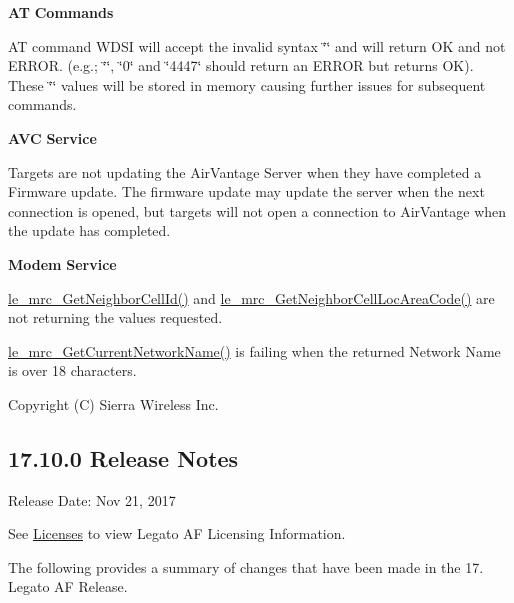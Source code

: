 {\bfseries AT} {\bfseries Commands} 
\begin{DoxyItemize}
\item AT command {\ttfamily W\+D\+SI} will accept the invalid syntax \char`\"{}\char`\"{} and will return {\ttfamily OK} and not {\ttfamily E\+R\+R\+OR}. (e.\+g.; \char`\"{}\char`\"{}, \char`\"{}0\char`\"{} and \char`\"{}4447\char`\"{} should return an {\ttfamily E\+R\+R\+OR} but returns {\ttfamily OK}). These \char`\"{}\char`\"{} values will be stored in memory causing further issues for subsequent commands.
\end{DoxyItemize}

{\bfseries A\+VC} {\bfseries Service} 
\begin{DoxyItemize}
\item Targets are not updating the Air\+Vantage Server when they have completed a Firmware update. The firmware update may update the server when the next connection is opened, but targets will not open a connection to Air\+Vantage when the update has completed.
\end{DoxyItemize}

{\bfseries Modem} {\bfseries Service} 
\begin{DoxyItemize}
\item {\ttfamily \hyperlink{le__mrc__interface_8h_abdbc94e474235417d8610e2eb95558eb}{le\+\_\+mrc\+\_\+\+Get\+Neighbor\+Cell\+Id()}} and {\ttfamily \hyperlink{le__mrc__interface_8h_a70ba0ca70367bc673a6bca1e246bb88f}{le\+\_\+mrc\+\_\+\+Get\+Neighbor\+Cell\+Loc\+Area\+Code()}} are not returning the values requested.
\item {\ttfamily \hyperlink{le__mrc__interface_8h_a45fe1941f520c1e4a23b2794dd2a8232}{le\+\_\+mrc\+\_\+\+Get\+Current\+Network\+Name()}} is failing when the returned Network Name is over 18 characters.
\end{DoxyItemize}

Copyright (C) Sierra Wireless Inc. \hypertarget{releaseNotes17100}{}\subsection{17.10.0 Release Notes}\label{releaseNotes17100}
Release Date\+: Nov 21, 2017

See \hyperlink{aboutLicenses}{Licenses} to view Legato AF Licensing Information.

The following provides a summary of changes that have been made in the 17. Legato AF Release.

